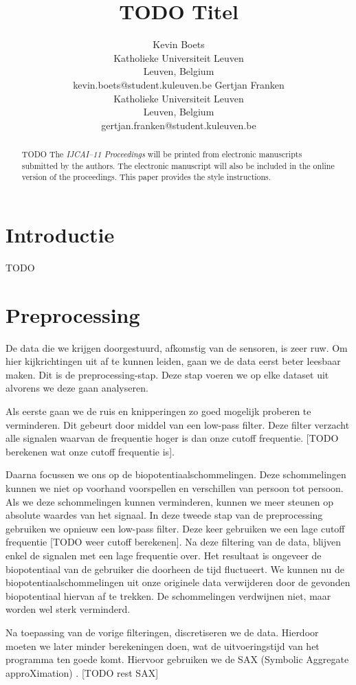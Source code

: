 \documentclass{article}
\title{TODO Titel}
\author{Kevin Boets \\ Katholieke Universiteit Leuven\\ Leuven, Belgium \\ kevin.boets@student.kuleuven.be
\And
Gertjan Franken \\ Katholieke Universiteit Leuven\\ Leuven, Belgium \\ gertjan.franken@student.kuleuven.be}
\begin{document}
\maketitle

\begin{abstract}
 TODO
  The {\it IJCAI--11 Proceedings} will be printed from electronic
  manuscripts submitted by the authors. The electronic manuscript will
  also be included in the online version of the proceedings. This paper
  provides the style instructions.
\end{abstract}

\section{Introductie}

TODO 

\section{Preprocessing}

De data die we krijgen doorgestuurd, afkomstig van de sensoren, is zeer ruw. Om hier kijkrichtingen uit af te kunnen leiden, gaan we de data eerst beter leesbaar maken. Dit is de preprocessing-stap. Deze stap voeren we op elke dataset uit alvorens we deze gaan analyseren.

Als eerste gaan we de ruis en knipperingen zo goed mogelijk proberen te verminderen. Dit gebeurt door middel van een low-pass filter. Deze filter verzacht alle signalen waarvan de frequentie hoger is dan onze cutoff frequentie. [TODO berekenen wat onze cutoff frequentie is].

Daarna focussen we ons op de biopotentiaalschommelingen. Deze schommelingen kunnen we niet op voorhand voorspellen en verschillen van persoon tot persoon. Als we deze schommelingen kunnen verminderen, kunnen we meer steunen op absolute waardes van het signaal. In deze tweede stap van de preprocessing gebruiken we opnieuw een low-pass filter. Deze keer gebruiken we een lage cutoff frequentie [TODO weer cutoff berekenen]. Na deze filtering van de data, blijven enkel de signalen met een lage frequentie over. Het resultaat is ongeveer de biopotentiaal van de gebruiker die doorheen de tijd fluctueert. We kunnen nu de biopotentiaalschommelingen uit onze originele data verwijderen door de gevonden biopotentiaal hiervan af te trekken. De schommelingen verdwijnen niet, maar worden wel sterk verminderd.

Na toepassing van de vorige filteringen, discretiseren we de data. Hierdoor moeten we later minder berekeningen doen, wat de uitvoeringstijd van het programma ten goede komt. Hiervoor gebruiken we de SAX (Symbolic Aggregate approXimation) \cite{sax}. [TODO rest SAX]
\end{document}
